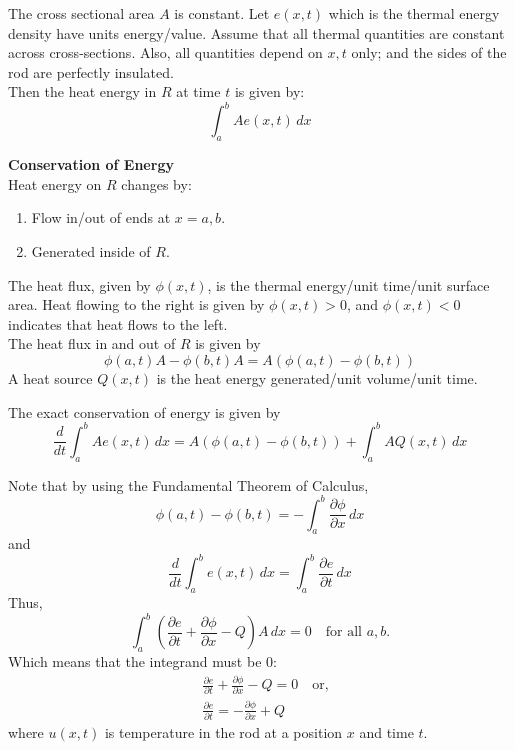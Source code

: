\documentclass{article}
\begin{document}
	The cross sectional area $ A $ is constant. Let $ e(x,t) $ which is the thermal energy density have units energy/value. Assume that all thermal quantities are constant across cross-sections. Also, all quantities depend on $ x,t $ only; and the sides of the rod are perfectly insulated. \\
	
	Then the heat energy in $ R $ at time $ t $ is given by:
	\[
		\int_a^b Ae(x,t) \, dx
	\]
	
	\textbf{Conservation of Energy} \\
	
	Heat energy on $ R $ changes by:
	\begin{enumerate}[label=(\arabic*)]
		\item Flow in/out of ends at $ x=a,b $.
		\item Generated inside of $ R $.
	\end{enumerate}
	
	The heat flux, given by $ \phi(x,t) $, is the thermal energy/unit time/unit surface area. Heat flowing to the right is given by $ \phi(x,t) > 0 $, and $ \phi(x,t) < 0 $ indicates that heat flows to the left. \\
	
	The heat flux in and out of $ R $ is given by
	\[
		\phi(a,t)A - \phi(b,t)A = A(\phi(a,t) - \phi(b,t))
	\]
	A heat source $ Q(x,t) $ is the heat energy generated/unit volume/unit time.
	
	The exact conservation of energy is given by
	\[
		\frac{d}{dt} \int_a^b Ae(x,t) \, dx = A(\phi(a,t) - \phi(b,t)) + \int_a^b AQ(x,t) \, dx
	\]
	
	Note that by using the Fundamental Theorem of Calculus,
	\[
		\phi(a,t) - \phi(b,t) = -\int_a^b \frac{\partial \phi}{\partial x} \, dx
	\]
	and
	\[
		\frac{d}{dt} \int_a^b e(x,t) \, dx = \int_a^b \frac{\partial e}{\partial t} \, dx
	\]
	Thus,
	\[
		\int_a^b \left( \frac{\partial e}{\partial t} + \frac{\partial \phi}{\partial x} - Q \right)A \, dx = 0 \quad \text{for all } a,b.
	\]
	Which means that the integrand must be 0:
	\begin{align*}
		&\frac{\partial e}{\partial t} + \frac{\partial \phi}{\partial x} - Q = 0 \quad \text{or,} \\
		&\frac{\partial e}{\partial t} = - \frac{\partial \phi}{\partial x} + Q
	\end{align*}
	where $ u(x,t) $ is temperature in the rod at a position $ x $ and time $ t $. \\
	
\end{document}
